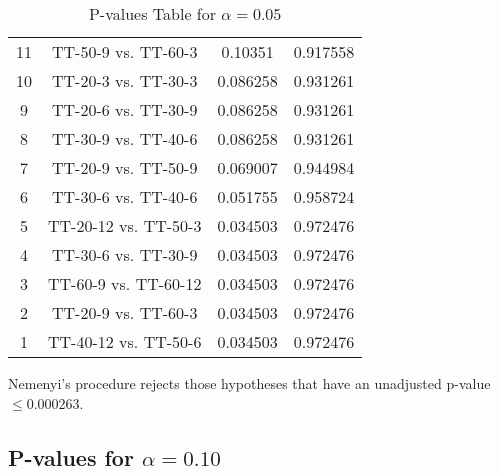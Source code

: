 \documentclass[a4paper,10pt]{article}
\begin{document}
\begin{landscape}
\begin{table}[!htp]
\begin{tabular}{cccc}
11&TT-50-9 vs. TT-60-3&0.10351&0.917558\\
10&TT-20-3 vs. TT-30-3&0.086258&0.931261\\
9&TT-20-6 vs. TT-30-9&0.086258&0.931261\\
8&TT-30-9 vs. TT-40-6&0.086258&0.931261\\
7&TT-20-9 vs. TT-50-9&0.069007&0.944984\\
6&TT-30-6 vs. TT-40-6&0.051755&0.958724\\
5&TT-20-12 vs. TT-50-3&0.034503&0.972476\\
4&TT-30-6 vs. TT-30-9&0.034503&0.972476\\
3&TT-60-9 vs. TT-60-12&0.034503&0.972476\\
2&TT-20-9 vs. TT-60-3&0.034503&0.972476\\
1&TT-40-12 vs. TT-50-6&0.034503&0.972476\\
\hline
\end{tabular}
\caption{P-values Table for $\alpha=0.05$}
\end{table}Nemenyi's procedure rejects those hypotheses that have an unadjusted p-value $\le0.000263$.

\pagebreak

\subsection{P-values for $\alpha=0.10$}


\end{landscape}
\end{document}

